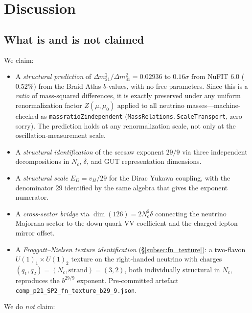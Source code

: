 \documentclass[12pt,a4paper]{article}
\theoremstyle{definition}
\theoremstyle{remark}
\newcommand{\lean}[1]{%
  \penalty-100
  \begingroup\def\_{\textunderscore\allowbreak}\texttt{#1}\endgroup}
\begin{document}
\section{Discussion}
\label{sec:discussion}

\subsection{What is and is not claimed}
\label{subsec:claims}

We claim:
\begin{itemize}[leftmargin=1.3em,itemsep=0.15em]
  \item A \emph{structural prediction} of $\Delta m^2_{21}/\Delta m^2_{31} = 0.02936$
    to $0.16\sigma$ from NuFIT 6.0 ($0.52\%$) from the Braid Atlas $b$-values, with no free parameters.  Since this is a \emph{ratio} of mass-squared differences, it is exactly preserved under any uniform renormalization factor $Z(\mu,\mu_0)$ applied to all neutrino masses---machine-checked as \lean{mass\_ratio\_Z\_independent} (\texttt{MassRelations.ScaleTransport}, zero sorry).  The prediction holds at any renormalization scale, not only at the oscillation-measurement scale.
  \item A \emph{structural identification} of the seesaw exponent
    $29/9$ via three independent decompositions in $N_c$, $\delta$,
    and GUT representation dimensions.
  \item A \emph{structural scale} $E_D = v_H/29$ for the Dirac Yukawa
    coupling, with the denominator $29$ identified by the same algebra
    that gives the exponent numerator.
  \item A \emph{cross-sector bridge} via $\dim(126) = 2N_c^2\delta$
    connecting the neutrino Majorana sector to the down-quark VV
    coefficient and the charged-lepton mirror offset.
  \item A \emph{Froggatt--Nielsen texture identification} (\S\ref{subsec:fn_texture}):
    a two-flavon $U(1)_1 \times U(1)_2$ texture on the right-handed neutrino
    with charges $(q_1, q_2) = (N_c, \mathrm{strand}) = (3, 2)$, both individually
    structural in $N_c$, reproduces the $b^{29/9}$ exponent.  Pre-committed
    artefact \nolinkurl{comp_p21_SP2_fn_texture_b29_9.json}.
\end{itemize}
We do \emph{not} claim:
\end{document}
